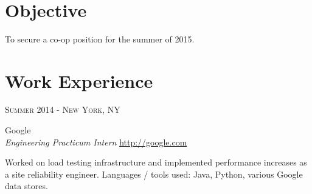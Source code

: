 \documentclass[10pt]{article} %
\begin{document}
\color{text1} %


\par{\\ %
	

\begin{minipage}[t]{0.5\textwidth} %
\vspace{0pt} %


\section{Objective}
\normalsize{To secure a co-op position for the summer of 2015.}\\


\section{Work Experience} 


{\raggedleft\textsc{Summer 2014 - New York, NY}\par}

{\raggedright\large Google \\
\textit{Engineering Practicum Intern}  \hfill {\small \href{http://google.com}{http://google.com}}\\ [5pt]}

\normalsize{Worked on load testing infrastructure and implemented performance increases
    as a site reliability engineer. Languages / tools used: Java, Python, various Google 
    data stores.}\\


\end{minipage}}
\end{document}
